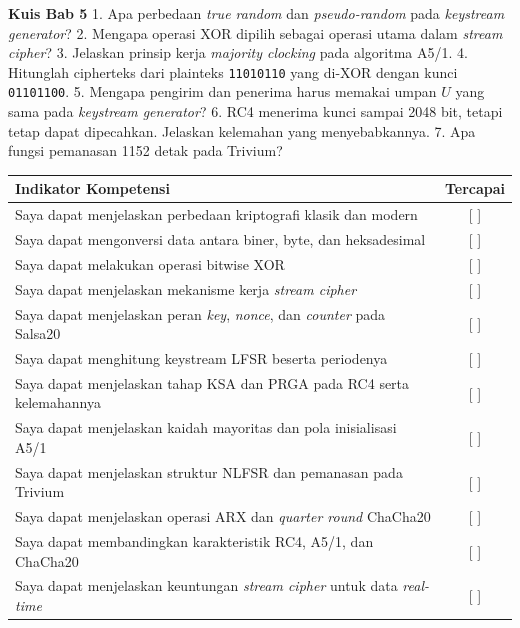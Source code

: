 
\begin{obeassessment}
\textbf{Kuis Bab 5}
1. Apa perbedaan \textit{true random} dan \textit{pseudo-random} pada \textit{keystream generator}?
2. Mengapa operasi XOR dipilih sebagai operasi utama dalam \textit{stream cipher}?
3. Jelaskan prinsip kerja \textit{majority clocking} pada algoritma A5/1.
4. Hitunglah cipherteks dari plainteks \texttt{11010110} yang di-XOR dengan kunci \texttt{01101100}.
5. Mengapa pengirim dan penerima harus memakai umpan $U$ yang sama pada \textit{keystream generator}?
6. RC4 menerima kunci sampai 2048 bit, tetapi tetap dapat dipecahkan. Jelaskan kelemahan yang menyebabkannya.
7. Apa fungsi pemanasan 1152 detak pada Trivium?
\end{obeassessment}
\begin{competencychecklist}
\begin{tabularx}{\linewidth}{|X|c|}
\hline
Indikator Kompetensi & Tercapai \\
\hline
Saya dapat menjelaskan perbedaan kriptografi klasik dan modern & [ ] \\
\hline
Saya dapat mengonversi data antara biner, byte, dan heksadesimal & [ ] \\
\hline
Saya dapat melakukan operasi bitwise XOR & [ ] \\
\hline
Saya dapat menjelaskan mekanisme kerja \textit{stream cipher} & [ ] \\
\hline
Saya dapat menjelaskan peran \textit{key}, \textit{nonce}, dan \textit{counter} pada Salsa20 & [ ] \\
\hline
Saya dapat menghitung keystream LFSR beserta periodenya & [ ] \\
\hline
Saya dapat menjelaskan tahap KSA dan PRGA pada RC4 serta kelemahannya & [ ] \\
\hline
Saya dapat menjelaskan kaidah mayoritas dan pola inisialisasi A5/1 & [ ] \\
\hline
Saya dapat menjelaskan struktur NLFSR dan pemanasan pada Trivium & [ ] \\
\hline
Saya dapat menjelaskan operasi ARX dan \textit{quarter round} ChaCha20 & [ ] \\
\hline
Saya dapat membandingkan karakteristik RC4, A5/1, dan ChaCha20 & [ ] \\
\hline
Saya dapat menjelaskan keuntungan \textit{stream cipher} untuk data \textit{real-time} & [ ] \\
\hline
\end{tabularx}
\end{competencychecklist}
